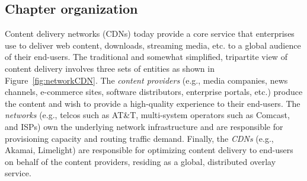 \subsection{Chapter organization}






Content delivery networks (CDNs) today provide a core service that enterprises use to deliver web content, downloads, streaming media, etc. to a global audience of their end-users. The traditional and somewhat simplified, tripartite view of content delivery involves three sets of entities as shown in Figure~\ref{fig:networkCDN}.  The {\em content providers}  (e.g., media companies, news channels, e-commerce sites, software distributors, enterprise portals, etc.) produce the content and wish to provide a high-quality experience to their end-users. The {\em networks} (e.g., telcos such as AT\&T, multi-system operators such as Comcast, and  ISPs) own  the underlying network infrastructure and are responsible for provisioning capacity and routing traffic demand. Finally, the {\em CDNs} (e.g., Akamai, Limelight) are responsible for optimizing content delivery to end-users on behalf of the content providers,  residing as a global, distributed overlay  service.



